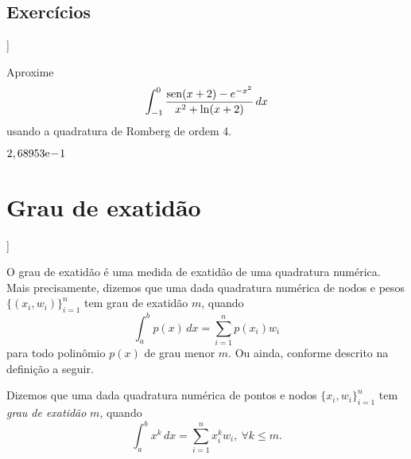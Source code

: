 \subsection*{Exercícios}

\begin{flushleft}
  [[tag:revisar]]
\end{flushleft}

\begin{exer}\label{exer:int_comp_fun}
  Aproxime
  \begin{equation}
    \int_{-1}^0 \frac{\operatorname{sen}(x+2)-e^{-x^2}}{x^2+\ln(x+2)}\,dx
  \end{equation}
usando a quadratura de Romberg de ordem 4.
\end{exer}
\begin{resp}
  $2,68953\mathrm{e}\!-\!1$
\end{resp}

\section{Grau de exatidão}\label{cap_integr_sec_grau_exat}

\begin{flushleft}
  [[tag:revisar]]
\end{flushleft}

O grau de exatidão é uma medida de exatidão de uma quadratura numérica. Mais precisamente, dizemos que uma dada quadratura numérica de nodos e pesos $\{(x_i, w_i)\}_{i=1}^n$ tem grau de exatidão $m$, quando
\begin{equation}
  \int_a^b p(x)\,dx = \sum_{i=1}^n p(x_i)w_i
\end{equation}
para todo polinômio $p(x)$ de grau menor $m$. Ou ainda, conforme descrito na definição a seguir.

\begin{defn}
  Dizemos que uma dada quadratura numérica de pontos e nodos $\{x_i, w_i\}_{i=1}^n$ tem \emph{grau de exatidão} $m$, quando
  \begin{equation}
    \int_a^b x^k\,dx = \sum_{i=1}^n x_i^kw_i,~\forall k\leq m.
  \end{equation}
\end{defn}

